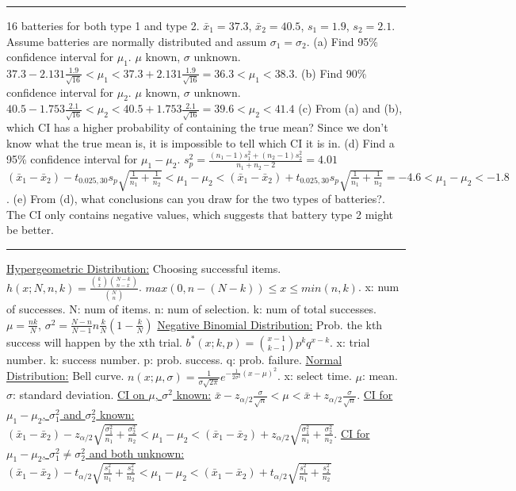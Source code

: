 \documentclass[9pt]{article}
\newcommand*\mean[1]{\bar{#1}}
\begin{document}
\begin{multicols*}{2}
    \rule{0.5\textwidth}{0.4pt}
    16 batteries for both type 1 and type 2. $\mean{x}_1=37.3$, $\mean{x}_2=40.5$, $s_1=1.9$, $s_2=2.1$. Assume batteries are normally distributed and assum $\sigma_1 = \sigma_2$.\newline
    (a) Find 95\% confidence interval for $\mu_1$. $\mu$ known, $\sigma$ unknown. 
    $37.3 - 2.131\frac{1.9}{\sqrt{16}} < \mu_1 < 37.3 + 2.131\frac{1.9}{\sqrt{16}} = 36.3 < \mu_1 < 38.3$.\newline
    (b) Find 90\% confidence interval for $\mu_2$. $\mu$ known, $\sigma$ unknown.
    $40.5 -1.753 \frac{2.1}{\sqrt{16}} < \mu_2 < 40.5 + 1.753 \frac{2.1}{\sqrt{16}} = 39.6 < \mu_2 < 41.4$\newline
    (c) From (a) and (b), which CI has a higher probability of containing the true mean?
    Since we don't know what the true mean is, it is impossible to tell which CI it is in.\newline
    (d) Find a 95\% confidence interval for $\mu_1-\mu_2$. $s_p^2=\frac{(n_1-1)s_1^2 + (n_2-1)s^2_2}{n_1+n_2-2} = 4.01$
    $(\mean{x}_1 - \mean{x}_2)-t_{0.025,30}s_p\sqrt{\frac{1}{n_1}+\frac{1}{n_2}} < \mu_1 - \mu_2 < (\mean{x}_1 - \mean{x}_2)+t_{0.025,30}s_p\sqrt{\frac{1}{n_1}+\frac{1}{n_2}}
    = -4.6 < \mu_1 - \mu_2 < -1.8$.\newline
    (e) From (d), what conclusions can you draw for the two types of batteries?.
    The CI only contains negative values, which suggests that battery type 2 might be better.
    \rule{0.5\textwidth}{0.4pt}
    \uline{Hypergeometric Distribution:} Choosing successful items. $h(x;N,n,k)=\frac{\binom{k}{x}\binom{N-k}{n-x}}
    {\binom{N}{n}}$. $max(0,n-(N-k))\leq x \leq min(n,k)$. x: num of successes. 
    N: num of items. n: num of selection. k: num of total successes. $\mu=\frac{nk}{N}$,
    $\sigma^2=\frac{N-n}{N-1}n\frac{k}{N}(1-\frac{k}{N})$\newline
    \uline{Negative Binomial Distribution:} Prob. the kth success will happen by the xth trial.
    $b^*(x;k,p)=\binom{x-1}{k-1}p^kq^{x-k}$. x: trial number. k: success number. p: prob. success.
    q: prob. failure.\newline
    \uline{Normal Distribution:} Bell curve. $n(x;\mu,\sigma)=\frac{1}{\sigma\sqrt{2\pi}}e^{-\frac{1}{2\sigma^2}(x-\mu)^2}$.
    x: select time. $\mu$: mean. $\sigma$: standard deviation.\newline
    \uline{CI on $\mu$, $\sigma^2$ known:} $\bar{x}-z_{\alpha/2}\frac{\sigma}{\sqrt{n}} < \mu < \bar{x}+z_{\alpha/2}\frac{\sigma}{\sqrt{n}}$.\newline
    \uline{CI for $\mu_1-\mu_2$, $\sigma_1^2$ and $\sigma_2^2$ known:} $(\bar{x}_1-\bar{x}_2)-z_{\alpha/2}\sqrt{\frac{\sigma_1^2}{n_1}+\frac{\sigma_2^2}{n_2}} < \mu_1-\mu_2 < (\bar{x}_1-\bar{x}_2)+z_{\alpha/2}\sqrt{\frac{\sigma_1^2}{n_1}+\frac{\sigma_2^2}{n_2}}$.\newline
    \uline{CI for $\mu_1-\mu_2$, $\sigma_1^2\not=\sigma_2^2$ and both unknown:} \\$(\bar{x}_1-\bar{x}_2)-t_{\alpha/2}\sqrt{\frac{s_1^2}{n_1}+\frac{s_2^2}{n_2}} < \mu_1-\mu_2 < (\bar{x}_1-\bar{x}_2)+t_{\alpha/2}\sqrt{\frac{s_1^2}{n_1}+\frac{s_2^2}{n_2}}$\newline
    
\end{multicols*}
\end{document}
